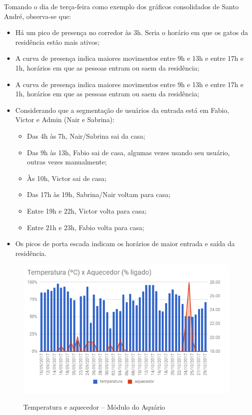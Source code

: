 Tomando o dia de terça-feira como exemplo dos gráficos consolidados de Santo André, observa-se que:

\begin{itemize}
	\item Há um pico de presença no corredor às 3h. Seria o horário em que os gatos da residência estão mais ativos;
	\item A curva de presença indica maiores movimentos entre 9h e 13h e entre 17h e 1h, horários em que as pessoas entram ou saem da residência;
	\item A curva de presença indica maiores movimentos entre 9h e 13h e entre 17h e 1h, horários em que as pessoas entram ou saem da residência;
	\item Considerando que a segmentação de usuários da entrada está em Fabio, Victor e Admin (Nair e Sabrina):
	\begin{itemize}
		\item Das 4h às 7h, Nair/Sabrina sai da casa;
		\item Das 9h às 13h, Fabio sai de casa, algumas vezes usando seu usuário, outras vezes manualmente;
		\item Às 10h, Victor sai de casa;
		\item Das 17h às 19h, Sabrina/Nair voltam para casa;
		\item Entre 19h e 22h, Victor volta para casa;
		\item Entre 21h e 23h, Fabio volta para casa;
	\end{itemize}
	\item Os picos de porta escada indicam os horários de maior entrada e saída da residência.
\end{itemize}

\begin{figure}[H]
	\centering
	\caption{Temperatura e aquecedor -- Módulo do Aquário}
	\includegraphics[width=1.0\textwidth]{TempAquecedorAqua}
	\label{fig:TempAquecedorAqua}
\end{figure}

